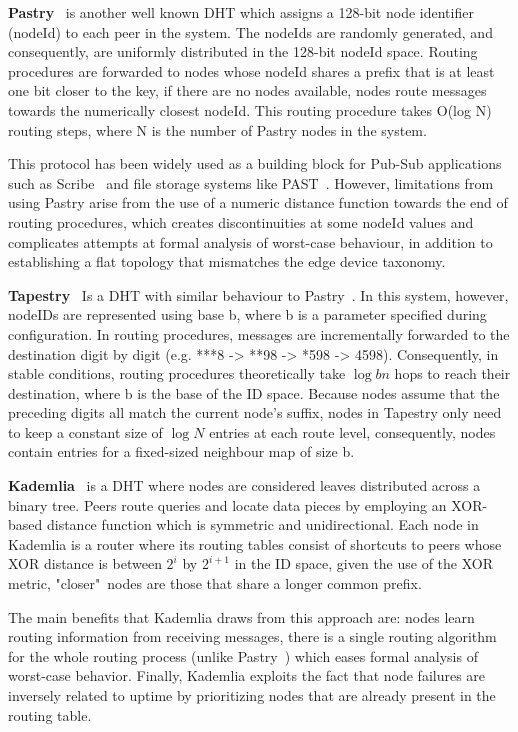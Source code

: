 \textbf{Pastry}~\cite{rowstron2001pastry} is another well known DHT which assigns a 128-bit node identifier (nodeId) to each peer in the system. The nodeIds are randomly generated, and consequently, are uniformly distributed in the 128-bit nodeId space. Routing procedures are forwarded to nodes whose nodeId shares a prefix that is at least one bit closer to the key, if there are no nodes available, nodes route messages towards the numerically closest nodeId. This routing procedure takes O(log N) routing steps, where N is the number of Pastry nodes in the system. 

This protocol has been widely used as a building block for Pub-Sub applications such as Scribe~\cite{10.1007/3-540-45546-9_3} and file storage systems like PAST~\cite{990064}. However, limitations from using Pastry arise from the use of a numeric distance function towards the end of routing procedures, which creates discontinuities at some nodeId values and complicates attempts at formal analysis of worst-case behaviour, in addition to establishing a flat topology that mismatches the edge device taxonomy.

\textbf{Tapestry}~\cite{tapestry} Is a DHT with similar behaviour to Pastry~\cite{rowstron2001pastry}. In this system, however, nodeIDs are represented using base b, where b is a parameter specified during configuration. In routing procedures, messages are incrementally forwarded to the destination digit by digit (e.g. ***8 -> **98 -> *598 -> 4598). Consequently, in stable conditions, routing procedures theoretically take $\log{b}{n}$ hops to reach their destination, where b is the base of the ID space. Because nodes assume that the preceding digits all match the current node's suffix, nodes in Tapestry only need to keep a constant size of $\log{N}$ entries at each route level, consequently, nodes contain entries for a fixed-sized neighbour map of size b.  

\textbf{Kademlia}~\cite{maymounkov2002kademlia} is a DHT where nodes are considered leaves distributed across a binary tree. Peers route queries and locate data pieces by employing an XOR-based distance function which is symmetric and unidirectional. Each node in Kademlia is a router where its routing tables consist of shortcuts to peers whose XOR distance is between \(2^{i}\) by \(2^{i + 1}\) in the ID space, given the use of the XOR metric, "closer"\ nodes are those that share a longer common prefix.

The main benefits that Kademlia draws from this approach are: nodes learn routing information from receiving messages, there is a single routing algorithm for the whole routing process (unlike Pastry~\cite{rowstron2001pastry}) which eases formal analysis of worst-case behavior. Finally, Kademlia exploits the fact that node failures are inversely related to uptime by prioritizing nodes that are already present in the routing table.


